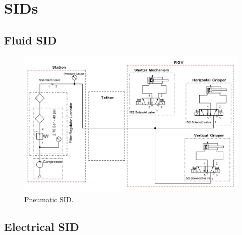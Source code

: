 \section{SIDs} \label{app:sids}

\subsection{Fluid SID} \label{app:fluid_sid}

\begin{figure}[h]
    \centering
    \includegraphics[width=\columnwidth]{Sections/7Appendicies/images/Pneumatic SID.jpg}
    \caption{Pneumatic SID.}
    \label{fig:pneumatic_sid}
\end{figure}

\subsection{Electrical SID}

